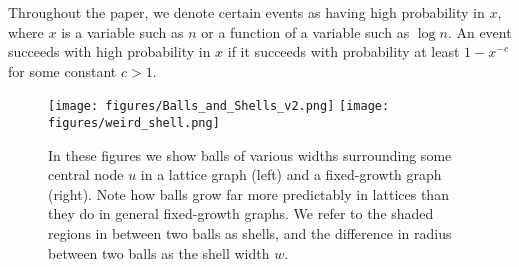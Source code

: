 Throughout the paper, we denote certain events as having high probability in
$x$, where $x$ is a variable such as $n$ or a function of a variable such as
$\log n$. An event succeeds with high probability in $x$ if it succeeds with
probability at least $1 - x^{-c}$ for some constant $c > 1$. 


\begin{figure}[t]
	\centering
	\texttt{[image: figures/Balls\_and\_Shells\_v2.png]}
	\hfill
	\texttt{[image: figures/weird\_shell.png]}
	\caption{
		In these figures we show balls of various widths surrounding some
		central node $u$ in a lattice graph (left) and a fixed-growth graph
        (right).
		Note how balls grow far more predictably in lattices than they do in
		general fixed-growth graphs.
		We refer to the shaded regions in between two balls as shells, and the
		difference in radius between two balls as the shell width $w$.
        \label{fig:balls-and-shells}
    }
	\vspace*{-\medskipamount}
\end{figure}


